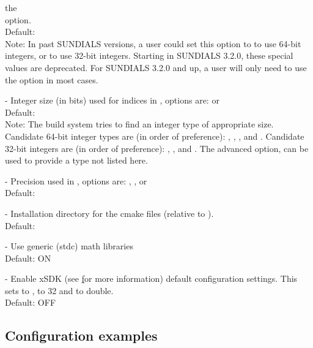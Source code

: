 \begin{description}
  the \\ \noindent {} option.
  \\
  Default:
  \\
  Note:
  In past SUNDIALS versions, a user could set this option to  to use 64-bit
  integers, or  to use 32-bit integers. Starting in SUNDIALS 3.2.0, these
  special values are deprecated. For SUNDIALS 3.2.0 and up, a user will only need to use
  the  option in most cases.
\item[\id{SUNDIALS\_INDEX\_SIZE}] -
  Integer size (in bits) used for indices in {\sundials}, options are:  or 
  \\
  Default: 
  \\
  Note:
  The build system tries to find an integer type of appropriate size. Candidate 64-bit
  integer types are (in order of preference): , , , and .
  Candidate 32-bit integers are (in order of preference): , , and .
  The advanced option,  can be used to provide a type not listed here.
\item[\id{SUNDIALS\_PRECISION}] -
  Precision used in {\sundials}, options are: , , or 
  \\
  Default: 
\item[\id{SUNDIALS\_INSTALL\_CMAKEDIR}] -
  Installation directory for the {\sundials} cmake files (relative to ).
  \\
  Default: 
\item[\id{USE\_GENERIC\_MATH}] -
  Use generic (stdc) math libraries
  \\
  Default: ON
\item[\id{USE\_XSDK\_DEFAULTS}] -
  Enable xSDK (see \href{https://xsdk.info} for more information) default
  configuration settings. This sets  to ,
   to 32 and  to double.
  \\
  Default: OFF
\end{description}




\subsection{Configuration examples}

